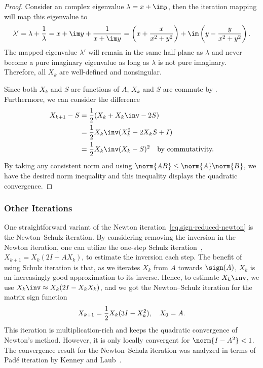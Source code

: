 \begin{proof}
Consider an complex eigenvalue $\lambda = x + \im y$, then the iteration
mapping will map this eigenvalue to
\begin{equation}\notag
  \lambda' = \lambda + \frac{1}{\lambda} =
  x + \im y + \frac{1}{x + \im y} =
  \left( x + \frac{x}{x^{2} + y^{2}} \right) + \im
  \left( y - \frac{y}{x^{2} + y^{2}} \right).
\end{equation}
The mapped eigenvalue $\lambda'$ will remain in the same half plane as
$\lambda$ and never become a pure imaginary eigenvalue as long as $\lambda$
is not pure imaginary. Therefore, all $X_{k}$ are well-defined and
nonsingular.

Since both $X_{k}$ and $S$ are functions of $A$, $X_{k}$ and $S$ are
commute by . Furthermore, we can consider
the difference
\begin{align*}
  X_{k + 1} - S & = \frac{1}{2}(X_{k} + X_{k}\inv - 2S) \\
                & = \frac{1}{2}X_{k}\inv(X_{k}^{2} - 2X_{k}S + I) \\
                & = \frac{1}{2} X_{k}\inv (X_{k} - S)^{2} \quad \text{by
                  commutativity.}                  
\end{align*}
By taking any consistent norm and using $\norm{AB}\le \norm{A}\norm{B}$, we
have the desired norm inequality and this inequality displays the quadratic
convergence.
\end{proof}

\subsubsection{Other Iterations}
One straightforward variant of the Newton
iteration~\eqref{eq.sign-reduced-newton} is the Newton--Schulz iteration.
By considering removing the inversion in the Newton iteration, one can
utilize the one-step Schulz iteration~,
$X_{k+1} = X_{k}(2I - AX_{k})$, to estimate the inversion each step. The
benefit of using Schulz iteration is that, as we iterates $X_k$ from $A$
towards $\sign(A)$, $X_{k}$ is an increasingly good approximation to its
inverse. Hence, to estimate $X_{k}\inv$, we use
$X_{k}\inv \approx X_{k}(2I - X_{k}X_{k})$, and we got the Newton--Schulz
iteration for the matrix sign function
\begin{equation}\notag
  X_{k + 1} = \frac{1}{2}X_{k}(3I - X_{k}^{2}),\quad X_{0} = A.
\end{equation}
This iteration is multiplication-rich and keeps the quadratic convergence
of Newton's method. However, it is only locally convergent for
$\norm{I - A^{2}} < 1$. The convergence result for the Newton--Schulz
iteration was analyzed in terms of Pad\'e iteration by Kenney and
Laub~. 

